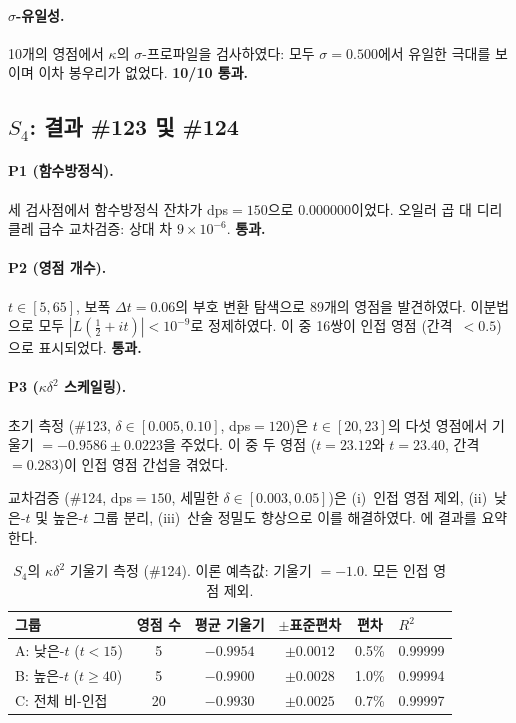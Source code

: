 \documentclass[11pt, a4paper]{article}
\theoremstyle{plain}
\theoremstyle{definition}
\newcommand{\abs}[1]{\left|#1\right|}
\newcommand{\kap}{\kappa}             %
\begin{document}
\paragraph{$\sigma$-유일성.}
10개의 영점에서 $\kap$의 $\sigma$-프로파일을 검사하였다:
모두 $\sigma = 0.500$에서 유일한 극대를 보이며 이차 봉우리가 없었다.
\textbf{10/10 통과.}


\subsection{$S_{4}$: 결과 \#123 및 \#124}
\label{sec:s4-results}

\paragraph{P1 (함수방정식).}
세 검사점에서 함수방정식 잔차가 dps${}=150$으로 $0.000000$이었다.
오일러 곱 대 디리클레 급수 교차검증: 상대 차 $9 \times 10^{-6}$.
\textbf{통과.}

\paragraph{P2 (영점 개수).}
$t \in [5, 65]$, 보폭 $\Delta t = 0.06$의 부호 변환 탐색으로
89개의 영점을 발견하였다. 이분법으로 모두
$\abs{L(\tfrac{1}{2}+it)} < 10^{-9}$로 정제하였다.
이 중 16쌍이 인접 영점 (간격~$<0.5$)으로 표시되었다.
\textbf{통과.}

\paragraph{P3 ($\kap\delta^{2}$ 스케일링).}
초기 측정 (\#123, $\delta \in [0.005, 0.10]$, dps${}=120$)은
$t \in [20,23]$의 다섯 영점에서 기울기 $= -0.9586 \pm 0.0223$을 주었다.
이 중 두 영점 ($t = 23.12$와 $t = 23.40$, 간격~$= 0.283$)이
인접 영점 간섭을 겪었다.

교차검증 (\#124, dps${}=150$, 세밀한 $\delta \in [0.003, 0.05]$)은
(i)~인접 영점 제외, (ii)~낮은-$t$ 및 높은-$t$ 그룹 분리,
(iii)~산술 정밀도 향상으로 이를 해결하였다.
에 결과를 요약한다.

\begin{table}[ht]
\centering
\caption{$S_{4}$의 $\kap\delta^{2}$ 기울기 측정 (\#124).
  이론 예측값: 기울기 $= -1.0$. 모든 인접 영점 제외.}
\label{tab:s4-kappa}
\begin{tabular}{@{}lccccl@{}}
\toprule
\textbf{그룹} & \textbf{영점 수} & \textbf{평균 기울기} & $\pm$\textbf{표준편차}
  & \textbf{편차} & $R^{2}$ \\
\midrule
A: 낮은-$t$ ($t < 15$) & 5 & $-0.9954$ & $\pm0.0012$ & 0.5\% & 0.99999 \\
B: 높은-$t$ ($t \ge 40$) & 5 & $-0.9900$ & $\pm0.0028$ & 1.0\% & 0.99994 \\
C: 전체 비-인접 & 20 & $-0.9930$ & $\pm0.0025$ & 0.7\% & 0.99997 \\
\bottomrule
\end{tabular}
\end{table}
\end{document}
